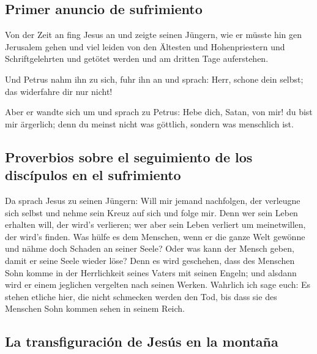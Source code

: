 \hypertarget{primer-anuncio-de-sufrimiento}{%
\subsection{Primer anuncio de
sufrimiento}\label{primer-anuncio-de-sufrimiento}}

 Von der Zeit an fing Jesus an und zeigte seinen Jüngern,
wie er müsste hin gen Jerusalem gehen und viel leiden von den Ältesten
und Hohenpriestern und Schriftgelehrten und getötet werden und am
dritten Tage auferstehen.

 Und Petrus nahm ihn zu sich, fuhr ihn an und sprach:
Herr, schone dein selbst; das widerfahre dir nur nicht!

 Aber er wandte sich um und sprach zu Petrus: Hebe dich,
Satan, von mir! du bist mir ärgerlich; denn du meinst nicht was
göttlich, sondern was menschlich ist.

\hypertarget{proverbios-sobre-el-seguimiento-de-los-discuxedpulos-en-el-sufrimiento}{%
\subsection{Proverbios sobre el seguimiento de los discípulos en el
sufrimiento}\label{proverbios-sobre-el-seguimiento-de-los-discuxedpulos-en-el-sufrimiento}}

 Da sprach Jesus zu seinen Jüngern: Will mir jemand
nachfolgen, der verleugne sich selbst und nehme sein Kreuz auf sich und
folge mir.  Denn wer sein Leben erhalten will, der wird's
verlieren; wer aber sein Leben verliert um meinetwillen, der wird's
finden.  Was hülfe es dem Menschen, wenn er die ganze
Welt gewönne und nähme doch Schaden an seiner Seele? Oder was kann der
Mensch geben, damit er seine Seele wieder löse?  Denn es
wird geschehen, dass des Menschen Sohn komme in der Herrlichkeit seines
Vaters mit seinen Engeln; und alsdann wird er einem jeglichen vergelten
nach seinen Werken.  Wahrlich ich sage euch: Es stehen
etliche hier, die nicht schmecken werden den Tod, bis dass sie des
Menschen Sohn kommen sehen in seinem Reich.

\hypertarget{la-transfiguraciuxf3n-de-jesuxfas-en-la-montauxf1a}{%
\subsection{La transfiguración de Jesús en la
montaña}\label{la-transfiguraciuxf3n-de-jesuxfas-en-la-montauxf1a}}

